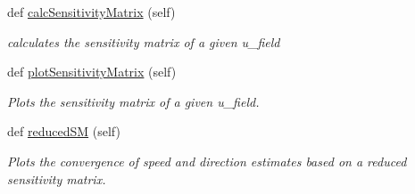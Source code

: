 \begin{DoxyCompactItemize}
def \mbox{\hyperlink{classvisualization__manager___d_j_1_1_visualization_manager_a979c45975c192515cbc17da7c07d2af3}{calc\+Sensitivity\+Matrix}} (self)
\begin{DoxyCompactList}\small\item\em calculates the sensitivity matrix of a given u\+\_\+field \end{DoxyCompactList}\item 
def \mbox{\hyperlink{classvisualization__manager___d_j_1_1_visualization_manager_a32793e43e3e04b3819dea7740e5b9ca1}{plot\+Sensitivity\+Matrix}} (self)
\begin{DoxyCompactList}\small\item\em Plots the sensitivity matrix of a given u\+\_\+field. \end{DoxyCompactList}\item 
def \mbox{\hyperlink{classvisualization__manager___d_j_1_1_visualization_manager_a92c5f58eddce15c3fa19edd63e66ef43}{reduced\+SM}} (self)
\begin{DoxyCompactList}\small\item\em Plots the convergence of speed and direction estimates based on a reduced sensitivity matrix. \end{DoxyCompactList}\end{DoxyCompactItemize}
